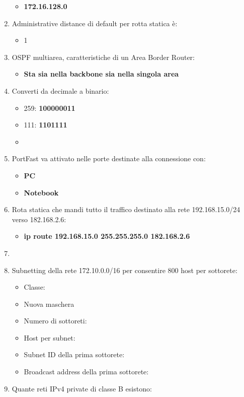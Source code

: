 \begin{enumerate}
  \begin{itemize}
  \item
    \textbf{172.16.128.0}
  \end{itemize}
\item
  Administrative distance di default per rotta statica è:

  \begin{itemize}
  \item
    1
  \end{itemize}
\item
  OSPF multiarea, caratteristiche di un Area Border Router:

  \begin{itemize}
  \item
    \textbf{Sta sia nella backbone sia nella singola area}
  \end{itemize}
\item
  Converti da decimale a binario:

  \begin{itemize}
  \item
    259: \textbf{100000011}
  \item
    111: \textbf{1101111}
  \item
  \end{itemize}
\item
  PortFast va attivato nelle porte destinate alla connessione con:

  \begin{itemize}
  \item
    \textbf{PC}
  \item
    \textbf{Notebook}
  \end{itemize}
\item
  Rota statica che mandi tutto il traffico destinato alla rete
  192.168.15.0/24 verso 182.168.2.6:

  \begin{itemize}
  \item
    \textbf{ip route 192.168.15.0 255.255.255.0 182.168.2.6}
  \end{itemize}
\item
\item
  Subnetting della rete 172.10.0.0/16 per consentire 800 host per
  sottorete:

  \begin{itemize}
  \item
    Classe:
  \item
    Nuova maschera
  \item
    Numero di sottoreti:
  \item
    Host per subnet:
  \item
    Subnet ID della prima sottorete:
  \item
    Broadcast address della prima sottorete:
  \end{itemize}
\item
  Quante reti IPv4 private di classe B esistono:


\end{enumerate}
